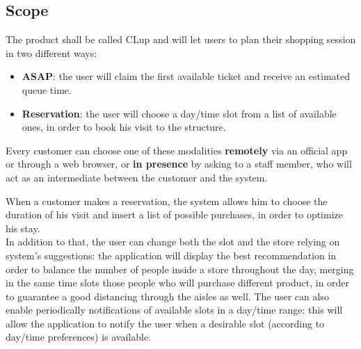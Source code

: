 \documentclass[table, 12pt]{article}
\begin{document}
\begin{flushleft}
    \subsection{Scope}
    The product shall be called CLup and will let users to plan their shopping session in two different ways:
    \begin{itemize}
        \item {\textbf{ASAP}: the user will claim the first available ticket and receive an estimated queue time.}
        \item {\textbf{Reservation}: the user will choose a day/time slot from a list of available ones, in order to book his visit to the structure.}
    \end{itemize}

    Every customer can choose one of these modalities \textbf{remotely} via an official app or through a web browser, or \textbf{in presence} by asking to a staff member, who will act as an intermediate between the customer and the system.

    When a customer makes a reservation, the system allows him to choose the duration of his visit and insert a list of possible purchases, in order to optimize his stay.\\

    In addition to that, the user can change both the slot and the store relying on system's suggestions: the application will display the best recommendation in order to balance the number of people inside a store throughout the day, merging in the same time slots those people who will purchase different product, in order to guarantee a good distancing through the aisles as well. The user can also enable periodically notifications of available slots in a day/time range: this will allow the application to notify the user when a desirable slot (according to day/time preferences) is available.



\end{flushleft}
\end{document}
